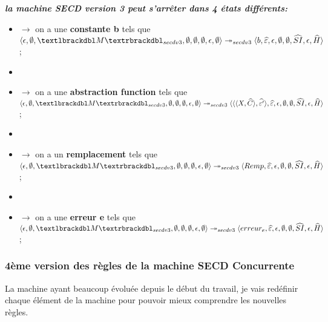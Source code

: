 \documentclass[10pt,a4paper]{article}
\begin{document}
				\textbf{\textit{la machine SECD version 3 peut s'arrêter dans 4 états différents:}}
				\smallbreak
				\begin{itemize}
					\item[]$\longrightarrow$ on a une \textbf{constante b} tels que $\langle \epsilon,\emptyset,\textlbrackdbl M\textrbrackdbl_{secdv3},\emptyset,\emptyset,\emptyset,\epsilon,\emptyset\rangle \twoheadrightarrow_{secdv3} \langle b,\widehat{\varepsilon},\epsilon,\emptyset,\emptyset,\widehat{SI},\epsilon,\widehat{H}\rangle$;
					\item[]
					\item[]$\longrightarrow$ on a une \textbf{abstraction function} tels que $\langle \epsilon,\emptyset,\textlbrackdbl M\textrbrackdbl_{secdv3},\emptyset,\emptyset,\emptyset,\epsilon,\emptyset\rangle \twoheadrightarrow_{secdv3} \langle\langle\langle X,\widehat{C}\rangle,\widehat{\varepsilon'}\rangle,\widehat{\varepsilon},\epsilon,\emptyset,\emptyset,\widehat{SI},\epsilon,\widehat{H}\rangle$;
					\item[]
					\item[]$\longrightarrow$ on a un \textbf{remplacement} tels que $\langle \epsilon,\emptyset,\textlbrackdbl M\textrbrackdbl_{secdv3},\emptyset,\emptyset,\emptyset,\epsilon,\emptyset\rangle \twoheadrightarrow_{secdv3} \langle Remp,\widehat{\varepsilon},\epsilon,\emptyset,\emptyset,\widehat{SI},\epsilon,\widehat{H}\rangle$;
					\item[]
					\item[]$\longrightarrow$ on a une \textbf{erreur e} tels que $\langle \epsilon,\emptyset,\textlbrackdbl M\textrbrackdbl_{secdv3},\emptyset,\emptyset,\emptyset,\epsilon,\emptyset\rangle \twoheadrightarrow_{secdv3} \langle erreur_{e},\widehat{\varepsilon},\epsilon,\emptyset,\emptyset,\widehat{SI},\epsilon,\widehat{H}\rangle$;
				\end{itemize}
				\newpage
				
				
				
			\subsubsection{4ème version des règles de la machine SECD Concurrente}
				La machine ayant beaucoup évoluée depuis le début du travail, je vais redéfinir chaque élément de la machine pour pouvoir mieux comprendre les nouvelles règles.
				\bigbreak
			
\end{document}

